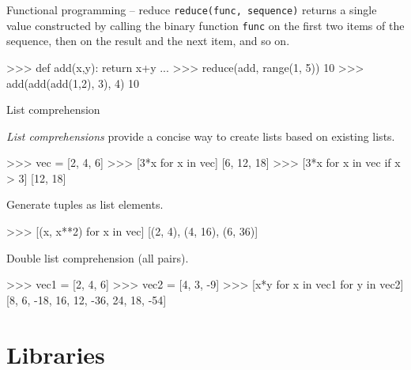 \documentclass[xetex,10pt]{beamer}
\def\pythoni{\lstinline[language=pythontim]}
\def\spacer{\vspace*{1em}}
\begin{document}
\begin{frame}[fragile]{Functional programming -- reduce}
	\pythoni{reduce(func, sequence)} returns a single value constructed by calling the binary function \pythoni{func} on the first two items of the sequence, then on the result and the next item, and so on.
	
	\spacer
\begin{python}
>>> def add(x,y): return x+y
...
>>> reduce(add, range(1, 5))
10
>>> add(add(add(1,2), 3), 4)
10
\end{python}

\end{frame}

\begin{frame}[fragile]{List comprehension}

\emph{List comprehensions} provide a concise way to create lists based on existing lists.
	
\begin{python}
>>> vec = [2, 4, 6]
>>> [3*x for x in vec]
[6, 12, 18]
>>> [3*x for x in vec if x > 3]
[12, 18]
\end{python}

\pause
Generate tuples as list elements.

\begin{python}
>>> [(x, x**2) for x in vec]
[(2, 4), (4, 16), (6, 36)]
\end{python}

\pause
Double list comprehension (all pairs).

\begin{python}
>>> vec1 = [2, 4, 6]
>>> vec2 = [4, 3, -9]
>>> [x*y for x in vec1 for y in vec2]
[8, 6, -18, 16, 12, -36, 24, 18, -54]
\end{python}

\end{frame}

\section{Libraries}
\end{document}

